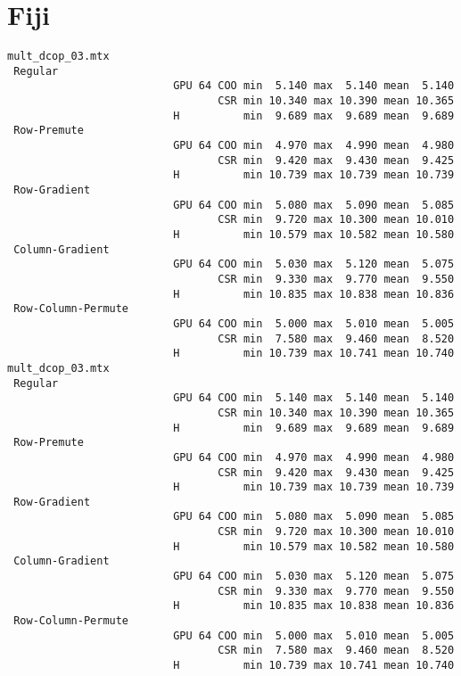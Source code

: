 \section{Fiji}
\label{sec:fiji}
{\tiny

\begin{verbatim}
mult_dcop_03.mtx
 Regular
                          GPU 64 COO min  5.140 max  5.140 mean  5.140
                                 CSR min 10.340 max 10.390 mean 10.365
                          H          min  9.689 max  9.689 mean  9.689
 Row-Premute
                          GPU 64 COO min  4.970 max  4.990 mean  4.980
                                 CSR min  9.420 max  9.430 mean  9.425
                          H          min 10.739 max 10.739 mean 10.739
 Row-Gradient
                          GPU 64 COO min  5.080 max  5.090 mean  5.085
                                 CSR min  9.720 max 10.300 mean 10.010
                          H          min 10.579 max 10.582 mean 10.580
 Column-Gradient
                          GPU 64 COO min  5.030 max  5.120 mean  5.075
                                 CSR min  9.330 max  9.770 mean  9.550
                          H          min 10.835 max 10.838 mean 10.836
 Row-Column-Permute
                          GPU 64 COO min  5.000 max  5.010 mean  5.005
                                 CSR min  7.580 max  9.460 mean  8.520
                          H          min 10.739 max 10.741 mean 10.740
mult_dcop_03.mtx
 Regular
                          GPU 64 COO min  5.140 max  5.140 mean  5.140
                                 CSR min 10.340 max 10.390 mean 10.365
                          H          min  9.689 max  9.689 mean  9.689
 Row-Premute
                          GPU 64 COO min  4.970 max  4.990 mean  4.980
                                 CSR min  9.420 max  9.430 mean  9.425
                          H          min 10.739 max 10.739 mean 10.739
 Row-Gradient
                          GPU 64 COO min  5.080 max  5.090 mean  5.085
                                 CSR min  9.720 max 10.300 mean 10.010
                          H          min 10.579 max 10.582 mean 10.580
 Column-Gradient
                          GPU 64 COO min  5.030 max  5.120 mean  5.075
                                 CSR min  9.330 max  9.770 mean  9.550
                          H          min 10.835 max 10.838 mean 10.836
 Row-Column-Permute
                          GPU 64 COO min  5.000 max  5.010 mean  5.005
                                 CSR min  7.580 max  9.460 mean  8.520
                          H          min 10.739 max 10.741 mean 10.740

\end{verbatim}}
